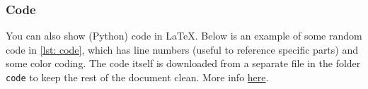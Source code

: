 \subsubsection{Code}
\noindent You can also show (Python) code in \LaTeX{}. Below is an example of some random code in \cref{lst: code}, which has line numbers (useful to reference specific parts) and some color coding. The code itself is downloaded from a separate file in the folder \texttt{code} to keep the rest of the document clean. More info \href{https://www.overleaf.com/learn/latex/Code_listing}{here}.  

